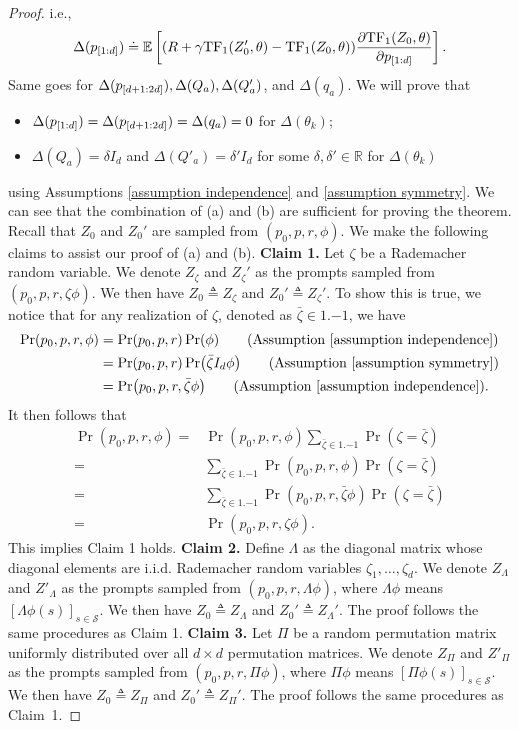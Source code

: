 \documentclass{article}
\newcommand{\explain}[1]{\tag*{(#1)}}
\newcommand{\fS}{\mathcal{S}}
\newcommand{\R}{\mathbb{R}}
\newcommand{\E}{\mathbb{E}}
\newcommand{\tf}{\text{TF}}
\begin{document}
\begin{proof}
i.e.,
\begin{align}
\Delta(p_\qty[{1:d}]) \doteq \E\left[(R + \gamma \tf_1(Z_0', \theta) - \tf_1(Z_0, \theta)) \pdv{\tf_1(Z_0, \theta)}{p_\qty[1:d]}\right].
\end{align}
Same goes for $\Delta(p_\qty[{d+1:2d}]), \Delta(Q_a), \Delta(Q_a')$, and $\Delta(q_a)$.
We will prove that
\begin{itemize}
    \item[(a)] $\Delta(p_\qty[{1:d}]) = \Delta(p_\qty[{d+1:2d}]) = \Delta(q_a) = 0$ for $\Delta (\theta_k)$;
     \item[(b)] $\Delta(Q_a) = \delta I_d$ and $\Delta(Q'_a) = \delta' I_d$ for some $\delta, \delta' \in\R$ for $\Delta(\theta_k)$
\end{itemize}
using Assumptions \ref{assumption independence} and \ref{assumption symmetry}.
We can see that the combination of (a) and (b) are sufficient for proving the theorem.
Recall that $Z_0$ and $Z_0'$ are sampled from $(p_0, p, r, \phi)$.
We make the following claims to assist our proof of (a) and (b).
\textbf{Claim 1.}
Let $\zeta$ be a Rademacher random variable.
We denote $Z_\zeta$ and $Z_\zeta'$ as the prompts sampled from $(p_0, p, r, \zeta \phi)$. We then have $Z_0 \triangleq Z_\zeta$ and $Z_0' \triangleq Z_\zeta'$.
To show this is true, we notice that for any realization of $\zeta$, denoted as $\bar \zeta \in \qty{1, -1}$,
we have
\begin{align}
    \Pr(p_0, p, r, \phi) &= \Pr(p_0, p, r)\Pr(\phi) \explain{Assumption~\ref{assumption independence}}\\
    &= \Pr(p_0, p, r)\Pr(\bar \zeta I_d \phi) \explain{Assumption~\ref{assumption symmetry}}\\
    &= \Pr(p_0, p, r, \bar \zeta \phi) \explain{Assumption~\ref{assumption independence}}.
\end{align}
It then follows that
\begin{align}
    \Pr(p_0, p, r, \phi) =& \Pr(p_0, p, r, \phi) \sum_{\bar \zeta \in \qty{1, -1}}  \Pr(\zeta = \bar \zeta) \\
    =&  \sum_{\bar \zeta \in \qty{1, -1}}  \Pr(p_0, p, r, \phi) \Pr(\zeta = \bar \zeta) \\
    =&  \sum_{\bar \zeta \in \qty{1, -1}}  \Pr(p_0, p, r, \bar \zeta \phi) \Pr(\zeta = \bar \zeta) \\
    =& \Pr(p_0, p, r, \zeta \phi).
\end{align}
This implies Claim 1 holds.
\textbf{Claim 2.}
Define $\Lambda$ as the diagonal matrix whose diagonal elements are i.i.d. Rademacher random variables $\zeta_1, \dots, \zeta_d$.
We denote $Z_\Lambda$ and $Z'_\Lambda$ as the prompts sampled from $(p_0, p, r, \Lambda\phi)$, where $\Lambda\phi$ means $[\Lambda\phi(s)]_{s\in\fS}$.
We then have $Z_0 \triangleq Z_\Lambda$ and $Z_0' \triangleq Z_\Lambda'$.
The proof follows the same procedures as Claim 1.
\textbf{Claim 3.}
Let $\Pi$ be a random permutation matrix uniformly distributed over all $d\times d$ permutation matrices.
We denote $Z_\Pi$ and $Z'_\Pi$ as the prompts sampled from $(p_0, p, r, \Pi\phi)$, where $\Pi\phi$ means $[\Pi\phi(s)]_{s\in\fS}$.
We then have $Z_0 \triangleq Z_\Pi$ and $Z_0' \triangleq Z_\Pi'$.
The proof follows the same procedures as Claim~1.

\end{proof}
\end{document}
